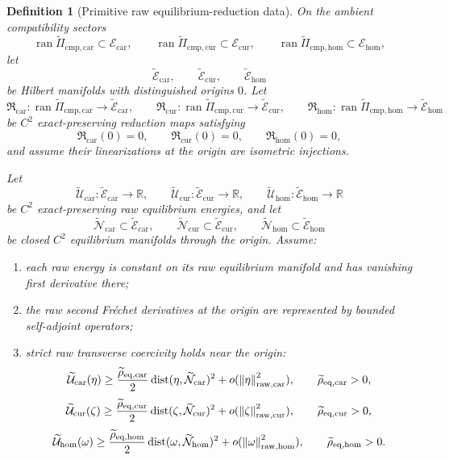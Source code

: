 \documentclass[11pt]{article}
\newcommand{\TensorEqClass}{\mathscr E_{\mathrm{car}}}
\newcommand{\CurEqClass}{\mathscr E_{\mathrm{cur}}}
\newcommand{\HomEqClass}{\mathscr E_{\mathrm{hom}}}
\newcommand{\TensorEqCmpProj}{\widetilde\Pi_{\mathrm{cmp,car}}}
\newcommand{\CurEqCmpProj}{\widetilde\Pi_{\mathrm{cmp,cur}}}
\newcommand{\HomEqCmpProj}{\widetilde\Pi_{\mathrm{cmp,hom}}}
\newcommand{\TensorRawEqClass}{\widetilde{\mathscr E}_{\mathrm{car}}}
\newcommand{\CurRawEqClass}{\widetilde{\mathscr E}_{\mathrm{cur}}}
\newcommand{\HomRawEqClass}{\widetilde{\mathscr E}_{\mathrm{hom}}}
\newcommand{\TensorEqReduce}{\mathfrak R_{\mathrm{car}}}
\newcommand{\CurEqReduce}{\mathfrak R_{\mathrm{cur}}}
\newcommand{\HomEqReduce}{\mathfrak R_{\mathrm{hom}}}
\newcommand{\TensorRawEnergy}{\widetilde{\mathcal U}_{\mathrm{car}}}
\newcommand{\CurRawEnergy}{\widetilde{\mathcal U}_{\mathrm{cur}}}
\newcommand{\HomRawEnergy}{\widetilde{\mathcal U}_{\mathrm{hom}}}
\newcommand{\TensorRawEqManifold}{\widetilde{\mathcal N}_{\mathrm{car}}}
\newcommand{\CurRawEqManifold}{\widetilde{\mathcal N}_{\mathrm{cur}}}
\newcommand{\HomRawEqManifold}{\widetilde{\mathcal N}_{\mathrm{hom}}}
\newcommand{\RawCarGap}{\widetilde\rho_{\mathrm{eq,car}}}
\newcommand{\RawCurGap}{\widetilde\rho_{\mathrm{eq,cur}}}
\newcommand{\RawHomGap}{\widetilde\rho_{\mathrm{eq,hom}}}
\newtheorem{definition}{Definition}
\begin{document}
\begin{definition}[Primitive raw equilibrium-reduction data]
\label{def:primitive_reduced_equilibrium}
On the ambient compatibility sectors
\[
\operatorname{ran}\TensorEqCmpProj\subset\TensorEqClass,\qquad
\operatorname{ran}\CurEqCmpProj\subset\CurEqClass,\qquad
\operatorname{ran}\HomEqCmpProj\subset\HomEqClass,
\]
let
\[
\TensorRawEqClass,\qquad
\CurRawEqClass,\qquad
\HomRawEqClass
\]
be Hilbert manifolds with distinguished origins \(0\). Let
\[
\TensorEqReduce:\operatorname{ran}\TensorEqCmpProj\to\TensorRawEqClass,\qquad
\CurEqReduce:\operatorname{ran}\CurEqCmpProj\to\CurRawEqClass,\qquad
\HomEqReduce:\operatorname{ran}\HomEqCmpProj\to\HomRawEqClass
\]
be \(C^2\) exact-preserving reduction maps satisfying
\begin{equation}
\TensorEqReduce(0)=0,\qquad
\CurEqReduce(0)=0,\qquad
\HomEqReduce(0)=0,
\label{eq:reduction_zero}
\end{equation}
and assume their linearizations at the origin are isometric injections.

Let
\[
\TensorRawEnergy:\TensorRawEqClass\to\mathbb R,\qquad
\CurRawEnergy:\CurRawEqClass\to\mathbb R,\qquad
\HomRawEnergy:\HomRawEqClass\to\mathbb R
\]
be \(C^2\) exact-preserving raw equilibrium energies, and let
\[
\TensorRawEqManifold\subset\TensorRawEqClass,\qquad
\CurRawEqManifold\subset\CurRawEqClass,\qquad
\HomRawEqManifold\subset\HomRawEqClass
\]
be closed \(C^2\) equilibrium manifolds through the origin. Assume:
\begin{enumerate}
    \item each raw energy is constant on its raw equilibrium manifold and has vanishing first derivative there;
    \item the raw second Fr\'echet derivatives at the origin are represented by bounded self-adjoint operators;
    \item strict raw transverse coercivity holds near the origin:
    \begin{equation}
    \TensorRawEnergy(\eta)
    \ge
    \frac{\RawCarGap}{2}\operatorname{dist}(\eta,\TensorRawEqManifold)^2
    +o(\norm{\eta}_{\mathrm{raw,car}}^2),
    \qquad
    \RawCarGap>0,
    \label{eq:raw_gap_car}
    \end{equation}
    \begin{equation}
    \CurRawEnergy(\zeta)
    \ge
    \frac{\RawCurGap}{2}\operatorname{dist}(\zeta,\CurRawEqManifold)^2
    +o(\norm{\zeta}_{\mathrm{raw,cur}}^2),
    \qquad
    \RawCurGap>0,
    \label{eq:raw_gap_cur}
    \end{equation}
    \begin{equation}
    \HomRawEnergy(\omega)
    \ge
    \frac{\RawHomGap}{2}\operatorname{dist}(\omega,\HomRawEqManifold)^2
    +o(\norm{\omega}_{\mathrm{raw,hom}}^2),
    \qquad
    \RawHomGap>0.
    \label{eq:raw_gap_hom}
    \end{equation}
\end{enumerate}


\end{definition}
\end{document}
